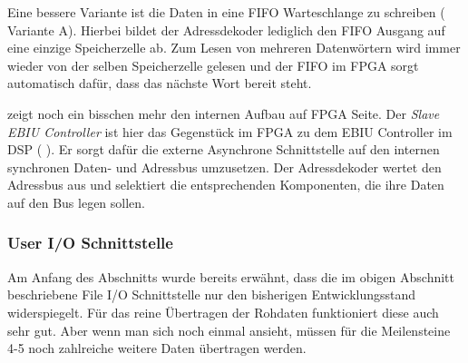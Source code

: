 Eine bessere Variante ist die Daten in eine \gls{FIFO} Warteschlange zu schreiben ( Variante A). Hierbei bildet der Adressdekoder lediglich den FIFO Ausgang auf eine einzige Speicherzelle ab. Zum Lesen von mehreren Datenwörtern wird immer wieder von der selben Speicherzelle gelesen und der FIFO im FPGA sorgt automatisch dafür, dass das nächste Wort bereit steht.

 zeigt noch ein bisschen mehr den internen Aufbau auf FPGA Seite. Der \emph{Slave EBIU Controller} ist hier das Gegenstück im FPGA zu dem EBIU Controller im DSP ( ). Er sorgt dafür die externe Asynchrone Schnittstelle auf den internen synchronen Daten- und Adressbus umzusetzen. Der Adressdekoder wertet den Adressbus aus und selektiert die entsprechenden Komponenten, die ihre Daten auf den Bus legen sollen.




\subsubsection{User I/O Schnittstelle}
Am Anfang des Abschnitts wurde bereits erwähnt, dass die im obigen Abschnitt beschriebene File I/O Schnittstelle nur den bisherigen Entwicklungsstand widerspiegelt. Für das reine Übertragen der Rohdaten funktioniert diese auch sehr gut. Aber wenn man sich noch einmal  ansieht, müssen für die Meilensteine 4-5 noch zahlreiche weitere Daten übertragen werden. 

